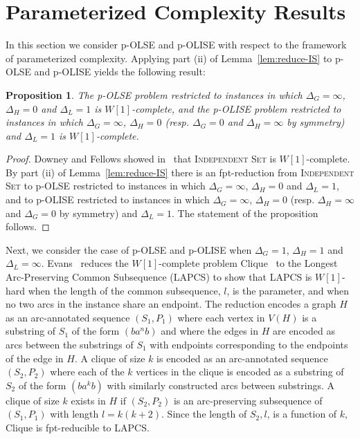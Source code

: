 \documentclass[11pt]{article}
\newtheorem{proposition}[theorem]{Proposition}
\begin{document}
\section{Parameterized Complexity Results}\label{subsec:parameterized}

In this section we consider p-OLSE and p-OLISE with respect to the framework of parameterized complexity. Applying part (ii) of Lemma~\ref{lem:reduce-IS} to p-OLSE and p-OLISE yields the following result:

\begin{proposition}
\label{prop:whardness1}
The p-OLSE problem restricted to instances in which $\Delta_G = \infty$, $\Delta_H = 0$ and $\Delta_L = 1$ is $W[1]$-complete, and the p-OLISE problem restricted to instances in which $\Delta_G = \infty$, $\Delta_H = 0$ (resp. $\Delta_G = 0$ and $\Delta_H =\infty$ by symmetry) and $\Delta_L = 1$ is $W[1]$-complete.
\end{proposition}

\begin{proof}
Downey and Fellows showed in~\cite{df2} that \textsc{Independent Set} is $W[1]$-complete.  By part (ii) of Lemma~\ref{lem:reduce-IS} there is an fpt-reduction from \textsc{Independent Set} to p-OLSE restricted to instances in which $\Delta_G = \infty$, $\Delta_H = 0$ and $\Delta_L = 1$, and to p-OLISE restricted to instances in which $\Delta_G = \infty$, $\Delta_H = 0$ (resp. $\Delta_H =\infty$ and $\Delta_G = 0$ by symmetry) and $\Delta_L = 1$. The statement of the proposition follows.
\end{proof}

Next, we consider the case of p-OLSE and p-OLISE when $\Delta_G=1$, $\Delta_H = 1$ and $\Delta_L = \infty$. Evans~\cite{evans} reduces the $W[1]$-complete problem {\sc Clique}~\cite{fptbook} to the {\sc Longest Arc-Preserving Common Subsequence} (LAPCS) to show that LAPCS is $W[1]$-hard when the length of the common subsequence, $l$, is the parameter, and when no two arcs in the instance share an endpoint. The reduction encodes a graph $H$ as an arc-annotated sequence $(S_1, P_1)$ where each vertex in $V(H)$ is a substring of $S_1$ of the form $(ba^nb)$ and where the edges in $H$ are encoded as arcs between the substrings of $S_1$ with endpoints corresponding to the endpoints of the edge in $H$.  A clique of size $k$ is encoded as an arc-annotated sequence $(S_2, P_2)$ where each of the $k$ vertices in the clique is encoded as a substring of $S_2$ of the form $(ba^kb)$ with similarly constructed arcs between substrings.  A clique of size $k$ exists in $H$ if $(S_2, P_2)$ is an arc-preserving subsequence of $(S_1, P_1)$ with length $l = k(k+2)$.  Since the length of $S_2, l$, is a function of $k$, {\sc Clique} is fpt-reducible to LAPCS.
\end{document}
